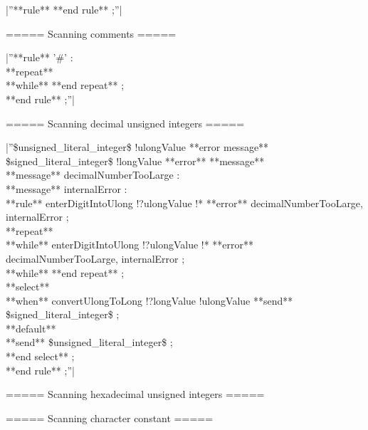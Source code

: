 {|''**rule** %
**end rule** ;''|

===== Scanning comments =====

|''**rule** '\#' :\\ 
 **repeat**\\ 
 **while** %
 **end repeat** ;\\ 
**end rule** ;''|

===== Scanning decimal unsigned integers =====

|''\$unsigned\_literal\_integer\$ !ulongValue **error message** %
\$signed\_literal\_integer\$ !longValue **error** **message** %
\\ 
**message** decimalNumberTooLarge : %
\\ 
**message** internalError : %
\\ 
**rule** %
 enterDigitIntoUlong !?ulongValue !* **error** decimalNumberTooLarge, internalError ;\\ 
 **repeat**\\ 
 **while** %
  enterDigitIntoUlong !?ulongValue !* **error** decimalNumberTooLarge, internalError ;\\ 
 **while** %
 **end repeat** ;\\ 
 **select**\\ 
 **when** %
  convertUlongToLong !?longValue !ulongValue %
  **send** \$signed\_literal\_integer\$ ;\\ 
 **default**\\ 
  **send** \$unsigned\_literal\_integer\$ ;\\ 
 **end select** ;\\ 
**end rule** ;''|

===== Scanning hexadecimal unsigned integers =====

===== Scanning character constant =====

}

